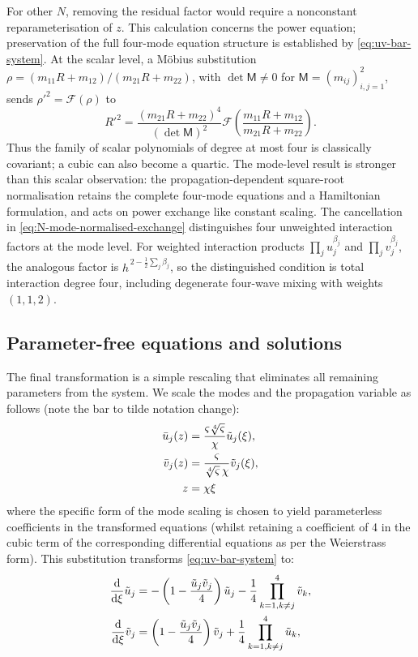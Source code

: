 \documentclass{optica-article}
\numberwithin{equation}{section}
\begin{document}
For other $N$, removing the residual factor would require a nonconstant reparameterisation of $z$.
This calculation concerns the power equation; preservation of the full four-mode equation structure is established by \eqref{eq:uv-bar-system}.
At the scalar level, a M\"obius substitution $\rho=(m_{11}R+m_{12})/(m_{21}R+m_{22})$, with $\det\mathsf M\ne0$ for $\mathsf M=(m_{ij})_{i,j=1}^2$, sends $\rho'^2=\mathcal F(\rho)$ to
\begin{equation}
R'^2=\frac{(m_{21}R+m_{22})^4}{(\det\mathsf M)^2}\mathcal F\!\left(\frac{m_{11}R+m_{12}}{m_{21}R+m_{22}}\right).
\end{equation}
Thus the family of scalar polynomials of degree at most four is classically covariant; a cubic can also become a quartic.
The mode-level result is stronger than this scalar observation: the propagation-dependent square-root normalisation retains the complete four-mode equations and a Hamiltonian formulation, and acts on power exchange like constant scaling.
The cancellation in \eqref{eq:N-mode-normalised-exchange} distinguishes four unweighted interaction factors at the mode level.
For weighted interaction products $\prod_j u_j^{\beta_j}$ and $\prod_j v_j^{\beta_j}$, the analogous factor is $h^{\,2-\frac12\sum_j\beta_j}$, so the distinguished condition is total interaction degree four, including degenerate four-wave mixing with weights $(1,1,2)$.

\subsection{Parameter-free equations and solutions}\label{subsec:tilde-coords}

The final transformation is a simple rescaling that eliminates all remaining parameters from the system.
We scale the modes and the propagation variable as follows (note the bar to tilde notation change):
\begin{align}
\bar{u}_j(z) &= \frac{\varsigma \sqrt[4]{\varsigma}}{\chi}\tilde{u}_j(\xi), \notag \\
\bar{v}_j(z) &= \frac{\varsigma }{\sqrt[4]{\varsigma}\,\chi}\tilde{v}_j(\xi), \notag \\
z &= \chi\xi
\end{align}
where the specific form of the mode scaling is chosen to yield parameterless coefficients in the transformed equations (whilst retaining a coefficient of 4 in the cubic term of the corresponding differential equations as per the Weierstrass form).
This substitution transforms \eqref{eq:uv-bar-system} to:
\begin{align}
\frac{\mathrm{d}}{\mathrm{d}\xi} \tilde{u}_j &= -\left(1 - \frac{\tilde{u}_j \tilde{v}_j}{4} \right) \tilde{u}_j - \frac{1}{4}\prod\limits_{k=1, k \ne j}^{4} \tilde{v}_k, \notag \\
\frac{\mathrm{d}}{\mathrm{d}\xi} \tilde{v}_j &= \left( 1 - \frac{\tilde{u}_j \tilde{v}_j}{4}\right) \tilde{v}_j + \frac{1}{4}\prod\limits_{k=1, k \ne j}^{4} \tilde{u}_k, \label{eq:uv-tilde-system}
\end{align}
\end{document}
